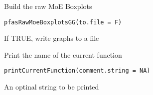 \documentclass[letterpaper]{book}
\begin{document}
%
\begin{Description}\relax
Build the raw MoE Boxplots
\end{Description}
%
\begin{Usage}
\begin{verbatim}
pfasRawMoeBoxplotsGG(to.file = F)
\end{verbatim}
\end{Usage}
%
\begin{Arguments}
\begin{ldescription}
\item[\code{to.file}] If TRUE, write graphs to a file
\end{ldescription}
\end{Arguments}
%
\begin{Description}\relax
Print the name of the current function
\end{Description}
%
\begin{Usage}
\begin{verbatim}
printCurrentFunction(comment.string = NA)
\end{verbatim}
\end{Usage}
%
\begin{Arguments}
\begin{ldescription}
\item[\code{comment.string}] An optinal string to be printed
\end{ldescription}
\end{Arguments}
\printindex{}
\end{document}
